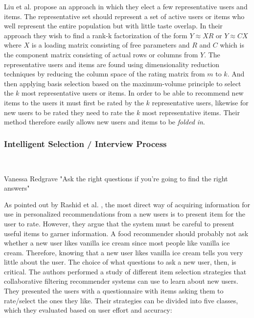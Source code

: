 
Liu et al. \cite{Liu2011} propose an approach in which they elect a few
representative users and items. The representative set should represent a set
of active users or items who well represent the entire population but with
little taste overlap. In their approach they wish to find a rank-k
factorization of the form $Y \approx XR$ or $Y \approx CX$ where $X$ is a
loading matrix consisting of free parameters and $R$ and $C$ which is the
component matrix consisting of actual rows or columns from $Y$. The
representative users and items are found using dimensionality reduction
techniques by reducing the column space of the rating matrix from $m$ to $k$.
And then applying basis selection based on the maximum-volume principle to
select the $k$ most representative users or items. In order to be able to
recommend new items to the users it must first be rated by the $k$
representative users, likewise for new users to be rated they need to rate the
$k$ most representative items. Their method therefore easily allows new users
and items to be \emph{folded in}.

\subsubsection{Intelligent Selection / Interview Process}\mbox{}\\


\begin{chapquote}[30pt]{Vanessa Redgrave}
  "Ask the right questions if you're going to find the right answers"
\end{chapquote}


As pointed out by Rashid et al. \cite{Rashid2002}, the most direct way of
acquiring information for use in personalized recommendations from a new users
is to present item for the user to rate. However, they argue that the system
must be careful to present useful items to garner information. A food
recommender should probably not ask whether a new user likes vanilla ice cream
since most people like vanilla ice cream. Therefore, knowing that a new user
likes vanilla ice cream tells you very little about the user. The choice of
what questions to ask a new user, then, is critical. The authors performed a
study of different item selection strategies that collaborative filtering
recommender systems can use to learn about new users. They presented the users
with a questionnaire with items asking them to rate/select the ones they like.
Their strategies can be divided into five classes, which they evaluated based
on user effort and accuracy:

